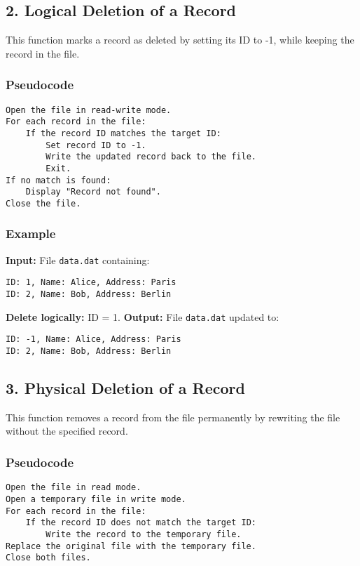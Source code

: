 \documentclass[a4paper, 12pt]{article}
\begin{document}
\subsection*{2. Logical Deletion of a Record}
This function marks a record as deleted by setting its ID to -1, while keeping the record in the file.

\subsubsection*{Pseudocode}
\begin{verbatim}
Open the file in read-write mode.
For each record in the file:
    If the record ID matches the target ID:
        Set record ID to -1.
        Write the updated record back to the file.
        Exit.
If no match is found:
    Display "Record not found".
Close the file.
\end{verbatim}

\subsubsection*{Example}
\textbf{Input:} File \texttt{data.dat} containing:
\begin{verbatim}
ID: 1, Name: Alice, Address: Paris
ID: 2, Name: Bob, Address: Berlin
\end{verbatim}
\textbf{Delete logically:} ID = 1.\newline
\textbf{Output:} File \texttt{data.dat} updated to:
\begin{verbatim}
ID: -1, Name: Alice, Address: Paris
ID: 2, Name: Bob, Address: Berlin
\end{verbatim}

\subsection*{3. Physical Deletion of a Record}
This function removes a record from the file permanently by rewriting the file without the specified record.

\subsubsection*{Pseudocode}
\begin{verbatim}
Open the file in read mode.
Open a temporary file in write mode.
For each record in the file:
    If the record ID does not match the target ID:
        Write the record to the temporary file.
Replace the original file with the temporary file.
Close both files.
\end{verbatim}
\end{document}
